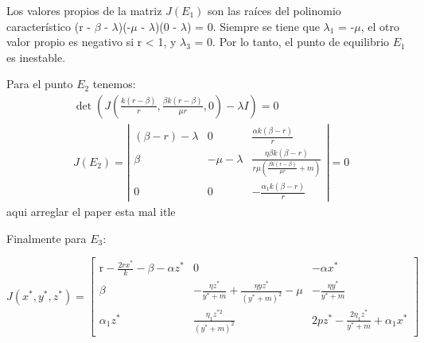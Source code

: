 \documentclass{wscpaperproc}
\theoremstyle{wsc}
\begin{document}
Los valores propios de la matriz $J(E_1)$ son las raíces del polinomio característico (r - $\beta$ - $\lambda$)(-$\mu$ - $\lambda$)(0 - $\lambda$) = 0. Siempre se tiene que $\lambda_1$ = -$\mu$, 
el otro valor propio es negativo si r < 1, y $\lambda_3$ = 0. Por lo tanto, el punto de equilibrio $E_1$ es inestable.\par

Para el punto $E_2$ tenemos:
\begin{equation} \label{Equilibrium}
	\begin{aligned}
		 & \operatorname{det}\left(J\left(\frac{k(r-\beta)}{r}, \frac{\beta k(r-\beta)}{\mu r}, 0\right)-\lambda I\right)=0                            \\
		 & J\left(E_2\right)=\left|\begin{array}{ccc}
			                           (\beta-r)-\lambda & 0            & \frac{\alpha k(\beta-r)}{r}                                                      \\
			                           \beta             & -\mu-\lambda & \frac{\eta \beta k(\beta-r)}{r \mu\left(\frac{\beta k(r-\beta)}{\mu r}+m\right)} \\
			                           0                 & 0            & -\frac{\alpha_1 k(\beta-r)}{r}
		                           \end{array}\right|=0
	\end{aligned}
\end{equation}
aqui arreglar el paper esta mal itle \par
Finalmente para $E_3$:

\begin{equation} \label{CharacteristicPolynomial}
	J\left(x^*, y^*, z^*\right)=\left[\begin{array}{ccc}
			\mathrm{r}-\frac{2 r x^*}{k}-\beta-\alpha z^* & 0                                                                   & -\alpha x^*                                     \\
			\beta                                         & -\frac{\eta z^*}{y^*+m}+\frac{\eta y z^*}{\left(y^*+m\right)^2}-\mu & -\frac{\eta y^*}{y^*+m}                         \\
			\alpha_1 z^*                                  & \frac{\eta_1 z^{* 2}}{\left(y^*+m\right)^2}                         & 2 p z^*-\frac{2 \eta_1 z^*}{y^*+m}+\alpha_1 x^*
		\end{array}\right]
\end{equation}
\end{document}
